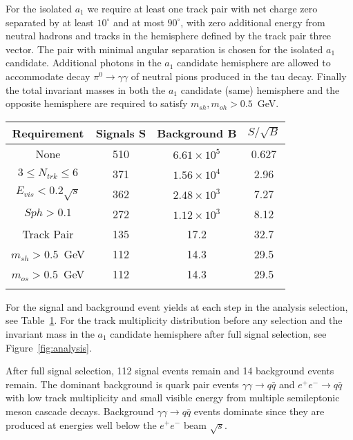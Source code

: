\documentclass{ws-ijmpa}
\begin{document}
For the isolated $a_1$ we require at least one track pair with net charge zero separated by at least $10^{\circ}$ and at most $90^{\circ}$, with zero additional energy from neutral hadrons and tracks in the hemisphere defined by the track pair three vector. The pair with minimal angular separation is chosen for the isolated $a_1$ candidate. Additional photons in the $a_1$ candidate hemisphere are allowed to accommodate decay $\pi^0 \rightarrow \gamma \gamma$ of neutral pions produced in the tau decay. Finally the total invariant masses in both the $a_1$ candidate (same) hemisphere and the opposite hemisphere are required to satisfy $m_{sh},m_{oh}>0.5$~GeV.

\begin{table}[h]
{\begin{tabular}{@{}cccc@{}} \toprule
Requirement & Signals S & Background B & $S/\sqrt{B}$ \\  \hline 
None & 510 & $6.61\times 10^5$ & 0.627 \\
$3 \leq N_{trk} \leq 6$ & 371 & $1.56\times 10^4$ & 2.96 \\
$E_{vis}<0.2 \sqrt{s}$ & 362 & $2.48\times 10^3$ & 7.27 \\
$Sph>0.1$  & 272 & $1.12\times 10^3$ & 8.12 \\
Track Pair & 135 & 17.2 & 32.7 \\
$m_{sh}>0.5$~GeV & 112 & 14.3 & 29.5 \\ 
$m_{os}>0.5$~GeV  & 112 & 14.3 & 29.5 \\ \botrule
\end{tabular}
\label{tab:yields}}
\end{table}

For the signal and background event yields at each step in the analysis selection, see Table~\ref{tab:yields}. For the track multiplicity distribution before any selection and the invariant mass in the $a_1$ candidate hemisphere after full signal selection, see Figure~\ref{fig:analysis}.  

After full signal selection, 112 signal events remain and 14 background events remain. The dominant background is quark pair events $\gamma \gamma \rightarrow q \bar{q}$ and $e^+ e^- \rightarrow q \bar{q}$ with low track multiplicity and small visible energy from multiple semileptonic meson cascade decays. Background $\gamma \gamma \rightarrow q\bar{q}$ events dominate since they are produced at energies well below the $e^+e^-$ beam $\sqrt{s}$.
\end{document}
